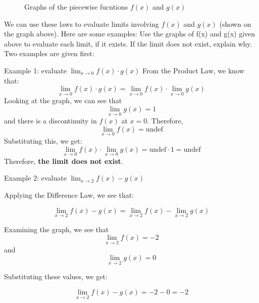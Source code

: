 \begin{figure}[htbp]
\centering
{}
\caption{Graphs of the piecewise fucntions $f(x)$ and $g(x)$}
\end{figure}
We can use these laws to evaluate limits involving $f(x)$ and $g(x)$ (shown on the 
graph above). Here are some examples:
Use the graphs of f(x) and g(x) given above to evaluate each limit, if it exists. 
If the limit does not exist, explain why. Two examples are given first:

Example 1: evaluate $\lim_{x\to0} f(x) \cdot g(x)$
From the Product Law, we know that:
$$\lim_{x\to0} f(x) \cdot g(x) = \lim_{x\to0}f(x) \cdot \lim_{x\to0} g(x)$$
Looking at the graph, we can see that $$\lim_{x\to0}g(x) = 1$$ and there is a 
discontinuity in $f(x)$ at $x=0$. Therefore, $$\lim_{x\to0}f(x) = \text{undef}$$
Substituting this, we get: $$\lim_{x\to0}f(x) \cdot \lim_{x\to0} g(x) = 
\text{undef} \cdot 1 = \text{undef}$$
Therefore, \textbf{the limit does not exist}. 

Example 2: evaluate $\lim_{x\to2}f(x) - g(x)$

Applying the Difference Law, we see that:

$$\lim_{x\to2}f(x) - g(x) = \lim_{x\to2}f(x) - \lim_{x\to2}g(x)$$

Examining the graph, we see that $$\lim_{x\to2}f(x) = -2$$ and $$\lim_{x\to2}g(x) = 
0$$

Substituting these values, we get:

$$\lim_{x\to2}f(x) - g(x) = -2 - 0 = -2$$

